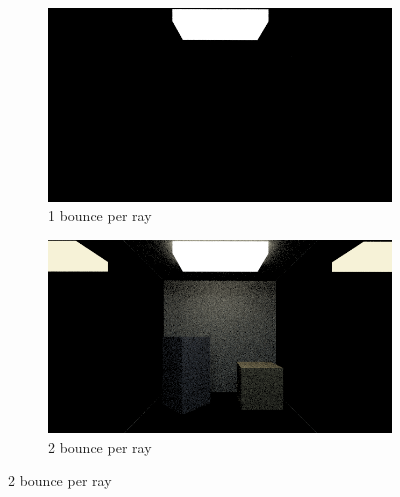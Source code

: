 \documentclass[titlepage,12pt]{report}
\begin{document}
\begin{figure}[H]
	\centering
	\medskip
	\begin{subfigure}{.48\textwidth}
		\centering
		\includegraphics[scale=0.315]{media/mirrors_rect/cornell_mirrors_1.png}
		\caption{1 bounce per ray}
		\label{mr_rect_1}
	\end{subfigure}
	\begin{subfigure}{.48\textwidth}
		\centering
		\includegraphics[scale=0.315]{media/mirrors_rect/cornell_mirrors_2.png}
		\caption{2 bounce per ray}
		\label{mr_rect_2}
	\end{subfigure}
	

\end{figure}
\end{document}
